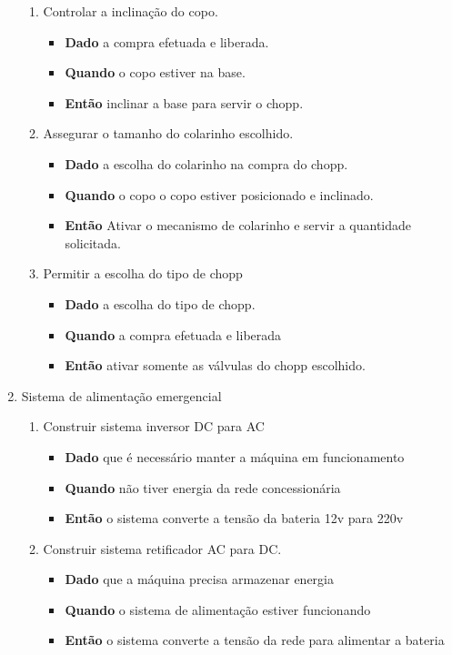 \begin{enumerate}
\begin{enumerate}
				\item Controlar a inclinação do copo.
						\begin{itemize}
							\item \textbf{Dado} a compra efetuada e liberada.
							\item \textbf{Quando} o copo estiver na base.
							\item \textbf{Então} inclinar a base para servir o chopp.
						\end{itemize}

				\item Assegurar o tamanho do colarinho escolhido.
						\begin{itemize}
							\item \textbf{Dado} a escolha do colarinho na compra do chopp.
							\item \textbf{Quando} o copo o copo estiver posicionado e inclinado.
							\item \textbf{Então} Ativar o mecanismo de colarinho e servir a quantidade solicitada.
						\end{itemize}

				\item Permitir a escolha do tipo de chopp
						\begin{itemize}
							\item \textbf{Dado} a escolha do tipo de chopp.
							\item \textbf{Quando} a compra efetuada e liberada
							\item \textbf{Então} ativar somente as válvulas do chopp escolhido.
						\end{itemize}
				\end{enumerate}

			\item Sistema de alimentação emergencial
				\begin{enumerate}
					\item Construir sistema inversor DC para AC
						\begin{itemize}
							\item \textbf{Dado} que é necessário manter a máquina em funcionamento
							\item \textbf{Quando} não tiver energia da rede concessionária
							\item \textbf{Então} o sistema converte a tensão da bateria 12v para 220v
						\end{itemize}

					\item Construir sistema retificador AC para DC.
						\begin{itemize}
							\item \textbf{Dado} que a máquina precisa armazenar energia
							\item \textbf{Quando} o sistema de alimentação estiver funcionando
							\item \textbf{Então} o sistema converte a tensão da rede para alimentar a bateria
						\end{itemize}


\end{enumerate}
\end{enumerate}
